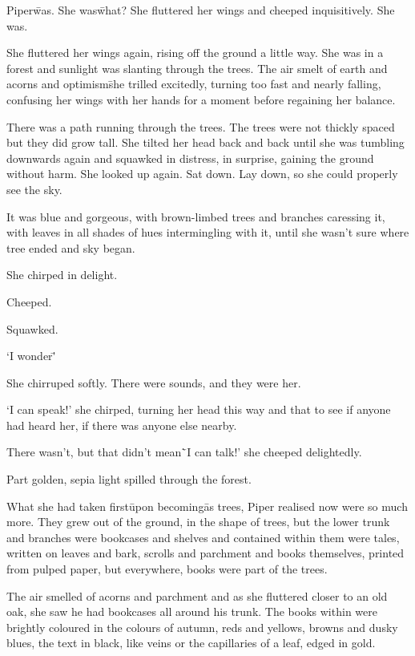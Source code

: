 
\prelude

Piper\=was. She was\=what? She fluttered her wings and cheeped
inquisitively. She was.

She fluttered her wings again, rising off the ground a little way. She
was in a forest and sunlight was slanting through the trees. The air
smelt of earth and acorns and optimism\=she trilled excitedly, turning
too fast and nearly falling, confusing her wings with her hands for a
moment before regaining her balance.

There was a path running through the trees. The trees were not thickly
spaced but they did grow tall. She tilted her head back and back until
she was tumbling downwards again and squawked in distress, in
surprise, gaining the ground without harm. She looked up again. Sat
down. Lay down, so she could properly see the sky.

It was blue and gorgeous, with brown-limbed trees and branches
caressing it, with leaves in all shades of hues intermingling with it,
until she wasn’t sure where tree ended and sky began.

She chirped in delight.

Cheeped.

Squawked.

`I wonder\='

She chirruped softly. There were sounds, and they were her.

`I can speak!' she chirped, turning her head this way and that to see
if anyone had heard her, if there was anyone else nearby.

There wasn't, but that didn't mean\=

`I can talk!' she cheeped delightedly.

\fugue

Part golden, sepia light spilled through the forest.

What she had taken first\=upon becoming\=as trees, Piper realised now
were so much more. They grew out of the ground, in the shape of trees,
but the lower trunk and branches were bookcases and shelves and
contained within them were tales, written on leaves and bark, scrolls
and parchment and books themselves, printed from pulped paper, but
everywhere, books were part of the trees.

The air smelled of acorns and parchment and as she fluttered closer to
an old oak, she saw he had bookcases all around his trunk. The books
within were brightly coloured in the colours of autumn, reds and
yellows, browns and dusky blues, the text in black, like veins or the
capillaries of a leaf, edged in gold.

